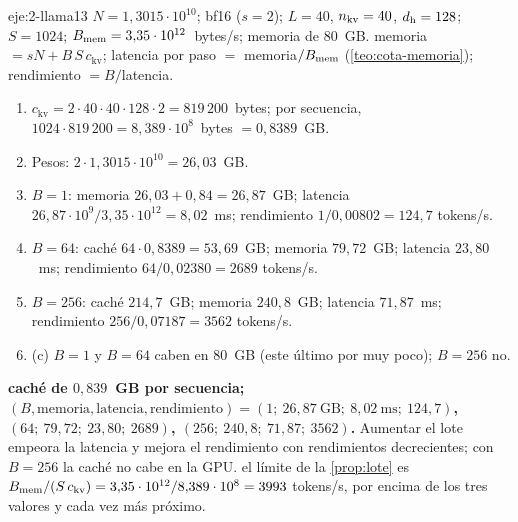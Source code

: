 \begin{solucion}{eje:2-llama13}
\datos $N=1{,}3015\cdot 10^{10}$; bf16 ($s=2$); $L=40$, $n_{\mathrm{kv}}=40$, $d_{\mathrm{h}}=128$; $S=1024$; $B_{\mathrm{mem}}=3{,}35\cdot 10^{12}$~bytes/s; memoria de 80~GB.
\planteamiento memoria $=sN+B\,S\,c_{\mathrm{kv}}$; latencia por paso $=$ memoria$/B_{\mathrm{mem}}$ (\cref{teo:cota-memoria}); rendimiento $=B/$latencia.
\pasos
\begin{enumerate}[label=\arabic*.]
  \item $c_{\mathrm{kv}}=2\cdot 40\cdot 40\cdot 128\cdot 2=819\,200$~bytes; por secuencia, $1024\cdot 819\,200=8{,}389\cdot 10^{8}$~bytes $=0{,}8389$~GB.
  \item Pesos: $2\cdot 1{,}3015\cdot 10^{10}=26{,}03$~GB.
  \item $B=1$: memoria $26{,}03+0{,}84=26{,}87$~GB; latencia $26{,}87\cdot 10^{9}/3{,}35\cdot 10^{12}=8{,}02$~ms; rendimiento $1/0{,}00802=124{,}7$ tokens/s.
  \item $B=64$: caché $64\cdot 0{,}8389=53{,}69$~GB; memoria $79{,}72$~GB; latencia $23{,}80$~ms; rendimiento $64/0{,}02380=2689$ tokens/s.
  \item $B=256$: caché $214{,}7$~GB; memoria $240{,}8$~GB; latencia $71{,}87$~ms; rendimiento $256/0{,}07187=3562$ tokens/s.
  \item (c) $B=1$ y $B=64$ caben en 80~GB (este último por muy poco); $B=256$ no.
\end{enumerate}
\resultado \textbf{caché de $0{,}839$~GB por secuencia; $(B,\text{memoria},\text{latencia},\text{rendimiento})=(1;\allowbreak\ 26{,}87~\text{GB};\allowbreak\ 8{,}02~\text{ms};\allowbreak\ 124{,}7)$, $(64;\allowbreak\ 79{,}72;\allowbreak\ 23{,}80;\allowbreak\ 2689)$, $(256;\allowbreak\ 240{,}8;\allowbreak\ 71{,}87;\allowbreak\ 3562)$.} Aumentar el lote empeora la latencia y mejora el rendimiento con rendimientos decrecientes; con $B=256$ la caché no cabe en la GPU.
\comprobacion el límite de la \cref{prop:lote} es $B_{\mathrm{mem}}/(S\,c_{\mathrm{kv}})=3{,}35\cdot 10^{12}/8{,}389\cdot 10^{8}=3993$ tokens/s, por encima de los tres valores y cada vez más próximo.
\end{solucion}

